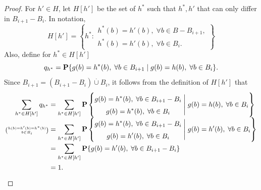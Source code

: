 \begin{proof}
For $h' \in H$, let $H[h']$ be the set of $h^*$ such that $h^*, h'$ that can only differ in $B_{i+1}-B_{i}$. In notation,
\[ H[h'] = \left\{ h^*: \begin{matrix}
    h^*(b) = h'(b),\; \forall b\in B-B_{i+1},\\
    h^*(b) = h'(b) ,\; \forall b\in B_{i}.
\end{matrix} \right\} \] 
Also, define for $h^* \in H[h']$
\[ q_{h^*} = \P\{g(b) = h^*(b),\; \forall b\in B_{i+1} \;|\; g(b) = h(b),\; \forall b\in B_{i} \}. \]
Since $B_{i+1} = (B_{i+1}- B_{i}) \overset{\cdot}{\cup} B_i$, it follows from the definition of $H[h']$ that
\[ \everymath{\displaystyle}\arraycolsep=1.4pt\def\arraystretch{1.5}
    \begin{array}{rcl}
    \sum_{h^* \in H[h']} q_{h^*} & = & \sum_{h^* \in H[h']} \P\left\{\begin{matrix} g(b) = h^*(b),\; \forall b\in B_{i+1}-B_i\\  g(b) = h^*(b) ,\; \forall b\in B_i \end{matrix} \;\Bigg|\; g(b) = h(b),\; \forall b\in B_{i} \right\} \\
    {  \scriptscriptstyle \binom{h(b) = h'(b) = h^*(b)}{b \in B_i} } 
    & = & \sum_{h^* \in H[h']} \P\left\{\begin{matrix} g(b) = h^*(b),\; \forall b\in B_{i+1}-B_i\\  g(b) = h'(b) ,\; \forall b\in B_i \end{matrix} \;\Bigg|\; g(b) = h'(b),\; \forall b\in B_{i} \right\} \\
     & = & \sum_{h^* \in H[h']} \P\{g(b) = h'(b),\; \forall b\in B_{i+1}-B_i\}\\
     & = & 1.
\end{array} \]  


\end{proof}
